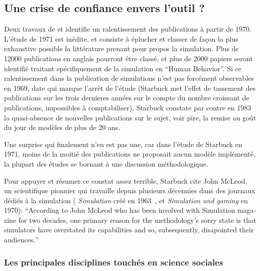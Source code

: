 
\subsection{Une crise de confiance envers l'outil ?}
\label{sec:critiques_simulation}

Deux travaux de \textcite{Dutton1971} et \textcite{Starbuck1983} identifie un ralentissement des publications à partir de 1970. L'étude de 1971 est inédite, et consiste à éplucher et classer de façon la plus exhaustive possible la littérature prenant pour propos la simulation. Plus de 12000 publications en anglais pourront être classé, et plus de 2000 papiers seront identifié traitant spécifiquement de la simulation en \foreignquote{english}{Human Behavior}. Si ce ralentissement dans la publication de simulations n'est pas forcément observables en 1969, date qui marque l'arrêt de l'étude (Starbuck met l'effet de tassement des publications sur les trois dernieres années sur le compte du nombre croissant de publications, impossibles à comptabiliser), Starbuck constate par contre en 1983 la quasi-absence de nouvelles publications sur le sujet, voir pire, la remise au goût du jour de modèles de plus de 20 ans.

Une surprise qui finalement n'en est pas une, car dans l'étude de Starbuck en 1971, moins de la moitié des publications ne proposait aucun modèle implémenté, la plupart des études se bornant à une discussion méthodologique.

Pour appuyer et résumer ce constat assez terrible, Starbuck cite John McLeod, un scientifique pionnier qui travaille depuis plusieurs décennies dans des journaux dédiés à la simulation ( \textit{Simulation} créé en 1963 , et \textit{Simulation and gaming} en 1970): \foreignquote{english}{According to  John McLeod who has been involved with Simulation magazine for two decades, one primary reason for the methodology's sorry state is that simulators have overstated its capabilities and so, subsequently, disapointed their audiences.}

\subsubsection{Les principales disciplines touchés en science sociales}
\label{ssec:disciplines_touches}

